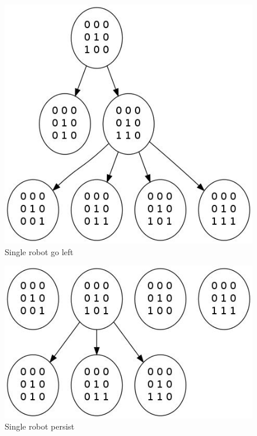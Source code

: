 \documentclass[11pt, a4paper]{article}
\theoremstyle{plain}
\theoremstyle{definition}
\theoremstyle{remark}
\begin{document}
\begin{figure}
\includegraphics[scale=0.50]{graph_single_left.jpg}
\caption{Single robot go left}
\label{graph:single_left}
\end{figure}

\begin{figure}
\includegraphics[scale=0.50]{graph_single_mid.jpg}
\caption{Single robot persist}
\label{graph:mid}
\end{figure}
\end{document}
